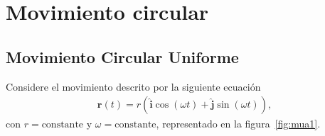 \chapter{Movimiento circular}
\label{chap:cin1}










\section{Movimiento Circular Uniforme}

Considere el movimiento descrito por la siguiente ecuaci\'on
\begin{align}
  \label{eq:mua}
  \mathbf{r}(t)=r\left(\hat{\mathbf{i}}\cos(\omega t)+\hat{\mathbf{j}}\sin(\omega t)\right),
\end{align}
con $r=\text{constante}$ y $\omega=\text{constante}$, representado en la figura~\ref{fig:mua1}.

